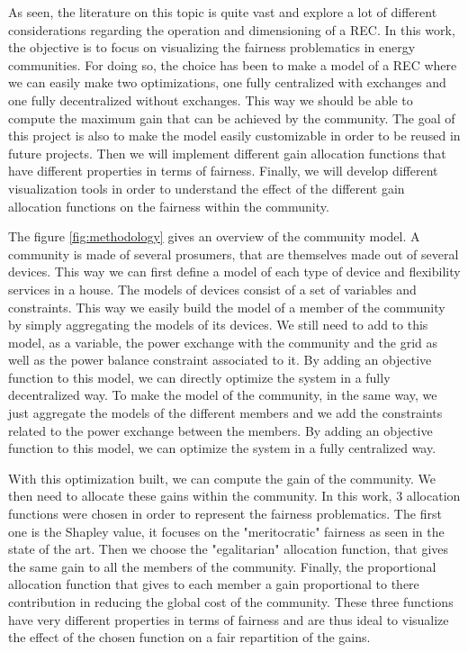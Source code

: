 \label{methodology}
As seen, the literature on this topic is quite vast and explore a lot of different considerations regarding the operation and dimensioning of a REC. In this work, the objective is to focus on visualizing the fairness problematics in energy communities. For doing so, the choice has been to make a model of a REC where we can easily make two optimizations, one fully centralized with exchanges and one fully decentralized without exchanges. This way we should be able to compute the maximum gain that can be achieved by the community. The goal of this project is also to make the model easily customizable in order to be reused in future projects. Then we will implement different gain allocation functions that have different properties in terms of fairness. Finally, we will develop different visualization tools in order to understand the effect of the different gain allocation functions on the fairness within the community.

The figure \ref{fig:methodology} gives an overview of the community model. A community is made of several prosumers, that are themselves made out of several devices. This way we can first define a model of each type of device and flexibility services in a house. The models of devices consist of a set of variables and constraints. This way we easily build the model of a member of the community by simply aggregating the models of its devices. We still need to add to this model, as a variable, the power exchange with the community and the grid as well as the power balance constraint associated to it. By adding an objective function to this model, we can directly optimize the system in a fully decentralized way. To make the model of the community, in the same way, we just aggregate the models of the different members and we add the constraints related to the power exchange between the members. By adding an objective function to this model, we can optimize the system in a fully centralized way.

With this optimization built, we can compute the gain of the community. We then need to allocate these gains within the community. In this work, 3 allocation functions were chosen in order to represent the fairness problematics. The first one is the Shapley value, it focuses on the "meritocratic" fairness as seen in the state of the art. Then we choose the "egalitarian" allocation function, that gives the same gain to all the members of the community. Finally, the proportional allocation function that gives to each member a gain proportional to there contribution in reducing the global cost of the community. These three functions have very different properties in terms of fairness and are thus ideal to visualize the effect of the chosen function on a fair repartition of the gains.

